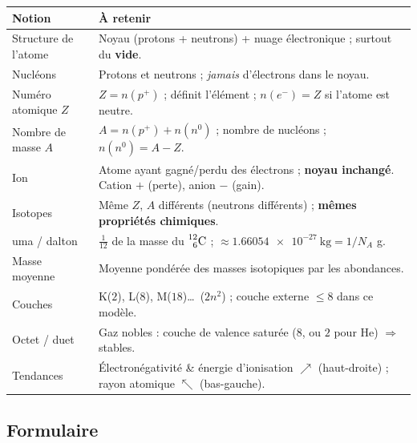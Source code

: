 \documentclass[11pt,a4paper]{article}
\newcommand{\nuc}[3]{\prescript{#1}{#2}{\mathrm{#3}}}  %
\newcommand{\pp}{p^{+}}      %
\newcommand{\ee}{e^{-}}      %
\newcommand{\nz}{n^{0}}      %
\newcommand{\np}{n(\pp)}     %
\renewcommand{\ne}{n(\ee)}   %
\newcommand{\nnn}{n(\nz)}    %
\begin{document}
\begin{center}
\renewcommand{\arraystretch}{1.4}
\begin{tabular}{>{\raggedright\arraybackslash}p{4.7cm} >{\raggedright\arraybackslash}p{10.2cm}}
\rowcolor{primary!18}
\textbf{Notion} & \textbf{À retenir} \\
\midrule
\rowcolor{primary!4}
Structure de l'atome & Noyau (protons + neutrons) + nuage électronique ; surtout du \textbf{vide}. \\
Nucléons & Protons et neutrons ; \emph{jamais} d'électrons dans le noyau. \\
\rowcolor{primary!4}
Numéro atomique $Z$ & $Z = \np$ ; définit l'élément ; $\ne = Z$ si l'atome est neutre. \\
Nombre de masse $A$ & $A = \np + \nnn$ ; nombre de nucléons ; $\nnn = A - Z$. \\
\rowcolor{primary!4}
Ion & Atome ayant gagné/perdu des électrons ; \textbf{noyau inchangé}. Cation $+$ (perte), anion $-$ (gain). \\
Isotopes & Même $Z$, $A$ différents (neutrons différents) ; \textbf{mêmes propriétés chimiques}. \\
\rowcolor{primary!4}
uma / dalton & $\tfrac{1}{12}$ de la masse du $\nuc{12}{6}{C}$ ; $\approx \SI{1,66054e-27}{\kilo\gram} = 1/N_{\!A}$ g. \\
Masse moyenne & Moyenne pondérée des masses isotopiques par les abondances. \\
\rowcolor{primary!4}
Couches & K($2$), L($8$), M($18$)\dots\ ($2n^2$) ; couche externe $\le 8$ dans ce modèle. \\
Octet / duet & Gaz nobles : couche de valence saturée ($8$, ou $2$ pour He) $\Rightarrow$ stables. \\
\rowcolor{primary!4}
Tendances & Électronégativité \& énergie d'ionisation $\nearrow$ (haut-droite) ; rayon atomique $\nwarrow$ (bas-gauche). \\
\bottomrule
\end{tabular}
\end{center}

\subsection{Formulaire}
\end{document}
